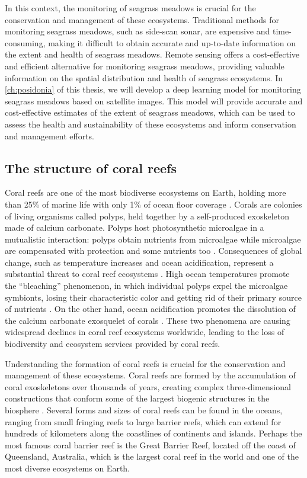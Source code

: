 In this context, the monitoring of seagrass meadows is crucial for the
conservation and management of these ecosystems. Traditional methods for
monitoring seagrass meadows, such as side-scan sonar, are expensive and
time-consuming, making it difficult to obtain accurate and up-to-date
information on the extent and health of seagrass meadows. Remote
sensing offers a cost-effective and efficient alternative for monitoring
seagrass meadows, providing valuable information on the spatial distribution
and health of seagrass ecosystems. In \cref{ch:posidonia} of this thesis, we
will develop a deep learning model for monitoring seagrass meadows based on
satellite images. This model will provide accurate and cost-effective
estimates
of the extent of seagrass meadows, which can be used to assess the health and
sustainability of these ecosystems and inform conservation and management
efforts.

\subsection{\label{sec:The structure of coral reefs} The structure of coral
  reefs}

Coral reefs are one of the most biodiverse ecosystems on Earth, holding more
than 25\% of marine life with only 1\% of ocean floor coverage
\cite{reaka1997global}. Corals are colonies of living organisms called polyps,
held together by a self-produced exoskeleton made of calcium carbonate.
Polyps
host photosynthetic microalgae in a mutualistic interaction: polyps obtain
nutrients from microalgae while microalgae are compensated with protection
and
some nutrients too \cite{Muller-Parker2015}. Consequences of global change,
such as temperature increases and ocean acidification, represent a
substantial
threat to coral reef ecosystems \cite{Couce2013}. High ocean temperatures
promote the ``bleaching'' phenomenon, in which individual polyps expel the
microalgae symbionts, losing their characteristic color and getting rid of
their primary source of nutrients \cite{Brown1997}. On the other hand, ocean
acidification promotes the dissolution of the calcium carbonate exosquelet of
corals \cite{Guldberg2007}. These two phenomena are causing widespread
declines
in coral reef ecosystems worldwide, leading to the loss of biodiversity and
ecosystem services provided by coral reefs.

Understanding the formation of coral reefs is crucial for the conservation
and
management of these ecosystems. Coral reefs are formed by the accumulation of
coral exoskeletons over thousands of years, creating complex
three-dimensional
constructions that conform some of the largest biogenic structures in the
biosphere \cite{wiener2021exploration}. Several forms and sizes of coral
reefs
can be found in the oceans, ranging from small fringing reefs to large
barrier
reefs, which can extend for hundreds of kilometers along the coastlines of
continents and islands. Perhaps the most famous coral barrier reef is the
Great Barrier Reef, located off the coast of Queensland, Australia, which is
the largest coral reef in the world and one of the most diverse ecosystems on
Earth.

